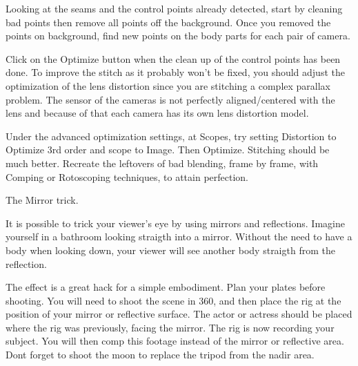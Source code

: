 \begin{fullwidth}
Looking at the seams and the control points already detected, start by cleaning bad points then remove all points off the background. Once you removed the points on background, find new points on the body parts for each pair of camera.

Click on the Optimize button when the clean up of the control points has been done. To improve the stitch as it probably won’t be fixed, you should adjust the optimization of the lens distortion since you are stitching a complex parallax problem. The sensor of the cameras is not perfectly aligned/centered with the lens and because of that each camera has its own lens distortion model. 

Under the advanced optimization settings, at Scopes, try setting Distortion to Optimize 3rd order and scope to Image. Then Optimize. Stitching should be much better. Recreate the leftovers of bad blending, frame by frame, with Comping or Rotoscoping techniques, to attain perfection.

{\large The Mirror trick. \par}

It is possible to trick your viewer's eye by using mirrors and reflections. Imagine yourself in a bathroom looking straigth into a mirror. Without the need to have a body when looking down, your viewer will see another body straigth from the reflection. 

The effect is a great hack for a simple embodiment. Plan your plates before shooting. You will need to shoot the scene in 360, and then place the rig at the position of your mirror or reflective surface. The actor or actress should be placed where the rig was previously, facing the mirror. The rig is now recording your subject. You will then comp this footage instead of the mirror or reflective area. Dont forget to shoot the moon to replace the tripod from the nadir area.


\clearpage
\end{fullwidth}